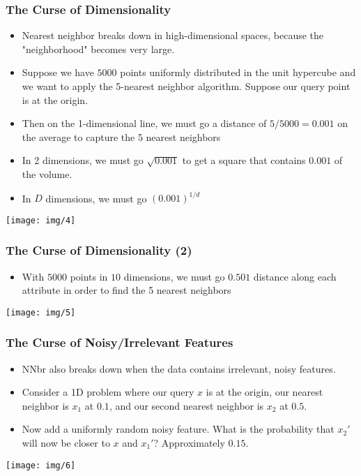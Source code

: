 \documentclass{beamer}
\newcommand*{\utb}{\item[{\texttt{[image: img/UTSymbols-Bullet.png]}}]}
\begin{document}
\begin{frame}
    \frametitle{The Curse of Dimensionality}
    \begin{itemize}
        \utb Nearest neighbor breaks down in high-dimensional spaces, because the "neighborhood" becomes very large.
        \utb Suppose we have $5000$ points uniformly distributed in the unit hypercube and we want to apply the 5-nearest neighbor algorithm. Suppose our query point is at the origin.
        \utb Then on the 1-dimensional line, we must go a distance of $5/5000 = 0.001$ on the average to capture the 5 nearest neighbors
        \utb In 2 dimensions, we must go $\sqrt{0.001}$ to get a square that contains $0.001$ of the volume.
        \utb In $D$ dimensions, we must go $(0.001)^{1/d}$
    \end{itemize}
    \begin{center}
        \texttt{[image: img/4]}
    \end{center}
\end{frame}

\begin{frame}
    \frametitle{The Curse of Dimensionality (2)}
    \begin{itemize}
        \utb With $5000$ points in $10$ dimensions, we must go $0.501$ distance along each attribute in order to find the 5 nearest neighbors
    \end{itemize}
    \begin{center}
        \texttt{[image: img/5]}
    \end{center}
\end{frame}

\begin{frame}
    \frametitle{The Curse of Noisy/Irrelevant Features}
    \begin{itemize}
        \utb NNbr also breaks down when the data contains irrelevant, noisy features.
        \utb Consider a 1D problem where our query $x$ is at the origin, our nearest neighbor is $x_1$ at $0.1$, and our second nearest neighbor is $x_2$ at $0.5$.
        \utb Now add a uniformly random noisy feature. What is the probability that $x_2'$ will now be closer to $x$ and $x_1'$? Approximately $0.15$.
    \end{itemize}
    \begin{center}
        \texttt{[image: img/6]}
    \end{center}
\end{frame}
\end{document}
